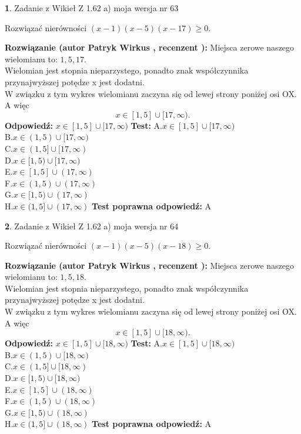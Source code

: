 \documentclass[12pt, a4paper]{article}
\theoremstyle{definition} %
\newtheorem{zad}{}
\newcommand{\zadStart}[1]{\begin{zad}#1\newline}
\newcommand{\zadStop}{\end{zad}}
\newcommand{\rozwStart}[2]{\noindent \textbf{Rozwiązanie (autor #1 , recenzent #2): }\newline}
\newcommand{\rozwStop}{\newline}
\newcommand{\odpStart}{\noindent \textbf{Odpowiedź:}\newline}
\newcommand{\odpStop}{\newline}
\newcommand{\testStart}{\noindent \textbf{Test:}\newline}
\newcommand{\testStop}{\newline}
\newcommand{\kluczStart}{\noindent \textbf{Test poprawna odpowiedź:}\newline}
\newcommand{\kluczStop}{\newline}
\begin{document}
\zadStart{Zadanie z Wikieł Z 1.62 a) moja wersja nr 63}

Rozwiązać nierówności $(x-1)(x-5)(x-17)\ge0$.
\zadStop
\rozwStart{Patryk Wirkus}{}
Miejsca zerowe naszego wielomianu to: $1, 5, 17$.\\
Wielomian jest stopnia nieparzystego, ponadto znak współczynnika przy\linebreak najwyższej potędze x jest dodatni.\\ W związku z tym wykres wielomianu zaczyna się od lewej strony poniżej osi OX. A więc $$x \in [1,5] \cup [17,\infty).$$
\rozwStop
\odpStart
$x \in [1,5] \cup [17,\infty)$
\odpStop
\testStart
A.$x \in [1,5] \cup [17,\infty)$\\
B.$x \in (1,5) \cup [17,\infty)$\\
C.$x \in (1,5] \cup [17,\infty)$\\
D.$x \in [1,5) \cup [17,\infty)$\\
E.$x \in [1,5] \cup (17,\infty)$\\
F.$x \in (1,5) \cup (17,\infty)$\\
G.$x \in [1,5) \cup (17,\infty)$\\
H.$x \in (1,5] \cup (17,\infty)$
\testStop
\kluczStart
A
\kluczStop



\zadStart{Zadanie z Wikieł Z 1.62 a) moja wersja nr 64}

Rozwiązać nierówności $(x-1)(x-5)(x-18)\ge0$.
\zadStop
\rozwStart{Patryk Wirkus}{}
Miejsca zerowe naszego wielomianu to: $1, 5, 18$.\\
Wielomian jest stopnia nieparzystego, ponadto znak współczynnika przy\linebreak najwyższej potędze x jest dodatni.\\ W związku z tym wykres wielomianu zaczyna się od lewej strony poniżej osi OX. A więc $$x \in [1,5] \cup [18,\infty).$$
\rozwStop
\odpStart
$x \in [1,5] \cup [18,\infty)$
\odpStop
\testStart
A.$x \in [1,5] \cup [18,\infty)$\\
B.$x \in (1,5) \cup [18,\infty)$\\
C.$x \in (1,5] \cup [18,\infty)$\\
D.$x \in [1,5) \cup [18,\infty)$\\
E.$x \in [1,5] \cup (18,\infty)$\\
F.$x \in (1,5) \cup (18,\infty)$\\
G.$x \in [1,5) \cup (18,\infty)$\\
H.$x \in (1,5] \cup (18,\infty)$
\testStop
\kluczStart
A
\kluczStop
\end{document}
